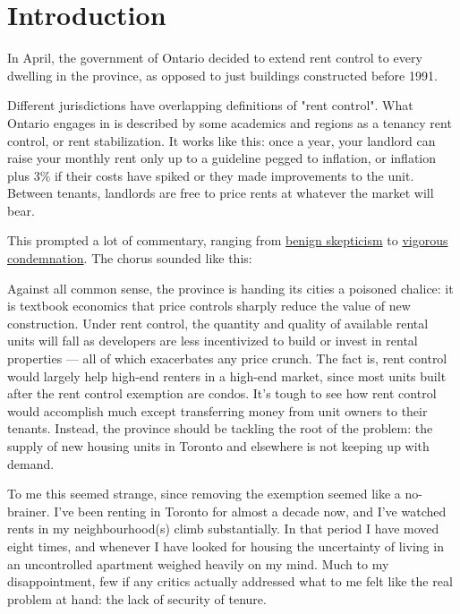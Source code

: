 \section{Introduction}

In April, the government of Ontario decided to extend rent control to every dwelling in the province, as opposed to just buildings constructed before 1991.

Different jurisdictions have overlapping definitions of "rent control". What Ontario engages in is described by some academics and regions as a tenancy rent control, or rent stabilization. It works like this: once a year, your landlord can raise your monthly rent only up to a guideline pegged to inflation, or inflation plus 3\% if their costs have spiked or they made improvements to the unit. Between tenants, landlords are free to price rents at whatever the market will bear.\cite{ltb-2017}

This prompted a lot of commentary, ranging from \href{http://tvo.org/article/current-affairs/the-next-ontario/ontario-needs-a-rental-rethink-but-should-tread-carefully}{benign skepticism} to \href{https://beta.theglobeandmail.com/real-estate/toronto/new-ontario-rent-control-rules-exact-opposite-of-what-is-needed-analyst-warns/article34569276/}{vigorous condemnation}. The chorus sounded like this:

Against all common sense, the province is handing its cities a poisoned chalice: it is textbook economics that price controls sharply reduce the value of new construction.\cite{gee-2017}  Under rent control, the quantity and quality of available rental units will fall as developers are less incentivized to build or invest in rental properties --- all of which exacerbates any price crunch.\cite{tal-2017} The fact is, rent control would largely help high-end renters in a high-end market, since most units built after the rent control exemption are condos. It’s tough to see how rent control would accomplish much except transferring money from unit owners to their tenants.\cite{selley} Instead, the province should be tackling the root of the problem: the supply of new housing units in Toronto and elsewhere is not keeping up with demand.\cite{thesun}

To me this seemed strange, since removing the exemption seemed like a no-brainer. I've been renting in Toronto for almost a decade now, and I've watched rents in my neighbourhood(s) climb substantially. In that period I have moved eight times, and whenever I have looked for housing the uncertainty of living in an uncontrolled apartment weighed heavily on my mind. Much to my disappointment, few if any critics actually addressed what to me felt like the real problem at hand: the lack of security of tenure.

